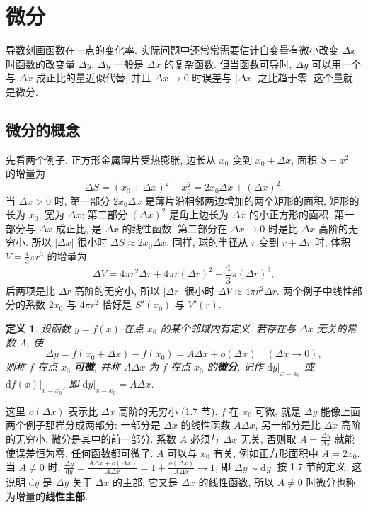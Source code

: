 \documentclass[UTF8,openany]{ctexbook}
\theoremstyle{chinesetextbook}
\newtheorem*{definitionsingle}{定义}
\newcommand{\dd}{\mathrm d}
\begin{document}
\section{微分}
导数刻画函数在一点的变化率. 实际问题中还常常需要估计自变量有微小改变 $\Delta x$ 时函数的改变量 $\Delta y$. $\Delta y$ 一般是 $\Delta x$ 的复杂函数. 但当函数可导时, $\Delta y$ 可以用一个与 $\Delta x$ 成正比的量近似代替, 并且 $\Delta x\to0$ 时误差与 $|\Delta x|$ 之比趋于零. 这个量就是微分.
\subsection{微分的概念}
先看两个例子. 正方形金属薄片受热膨胀, 边长从 $x_0$ 变到 $x_0+\Delta x$, 面积 $S=x^2$ 的增量为
\[
\Delta S=(x_0+\Delta x)^2-x_0^2=2x_0\Delta x+(\Delta x)^2.
\]
当 $\Delta x>0$ 时, 第一部分 $2x_0\Delta x$ 是薄片沿相邻两边增加的两个矩形的面积, 矩形的长为 $x_0$, 宽为 $\Delta x$; 第二部分 $(\Delta x)^2$ 是角上边长为 $\Delta x$ 的小正方形的面积. 第一部分与 $\Delta x$ 成正比, 是 $\Delta x$ 的线性函数; 第二部分在 $\Delta x\to0$ 时是比 $\Delta x$ 高阶的无穷小. 所以 $|\Delta x|$ 很小时 $\Delta S\approx2x_0\Delta x$. 同样, 球的半径从 $r$ 变到 $r+\Delta r$ 时, 体积 $\displaystyle V=\frac43\pi r^3$ 的增量为
\[
\Delta V=4\pi r^2\Delta r+4\pi r(\Delta r)^2+\frac43\pi(\Delta r)^3,
\]
后两项是比 $\Delta r$ 高阶的无穷小, 所以 $|\Delta r|$ 很小时 $\Delta V\approx4\pi r^2\Delta r$. 两个例子中线性部分的系数 $2x_0$ 与 $4\pi r^2$ 恰好是 $S'(x_0)$ 与 $V'(r)$.
\begin{definitionsingle}
设函数 $y=f(x)$ 在点 $x_0$ 的某个邻域内有定义. 若存在与 $\Delta x$ 无关的常数 $A$, 使
\[
\Delta y=f(x_0+\Delta x)-f(x_0)=A\Delta x+o(\Delta x)\quad(\Delta x\to0),
\]
则称 $f$ 在点 $x_0$ \textbf{可微}, 并称 $A\Delta x$ 为 $f$ 在点 $x_0$ 的\textbf{微分}, 记作 $\dd y\big|_{x=x_0}$ 或 $\dd f(x)\big|_{x=x_0}$, 即 $\dd y\big|_{x=x_0}=A\Delta x$.
\end{definitionsingle}
这里 $o(\Delta x)$ 表示比 $\Delta x$ 高阶的无穷小 (1.7 节). $f$ 在 $x_0$ 可微, 就是 $\Delta y$ 能像上面两个例子那样分成两部分: 一部分是 $\Delta x$ 的线性函数 $A\Delta x$, 另一部分是比 $\Delta x$ 高阶的无穷小. 微分是其中的前一部分. 系数 $A$ 必须与 $\Delta x$ 无关, 否则取 $\displaystyle A=\frac{\Delta y}{\Delta x}$ 就能使误差恒为零, 任何函数都可微了. $A$ 可以与 $x_0$ 有关, 例如正方形面积中 $A=2x_0$. 当 $A\ne0$ 时, $\displaystyle\frac{\Delta y}{\dd y}=\frac{A\Delta x+o(\Delta x)}{A\Delta x}=1+\frac{o(\Delta x)}{A\Delta x}\to1$, 即 $\Delta y\sim\dd y$. 按 1.7 节的定义, 这说明 $\dd y$ 是 $\Delta y$ 关于 $\Delta x$ 的主部; 它又是 $\Delta x$ 的线性函数, 所以 $A\ne0$ 时微分也称为增量的\textbf{线性主部}.
\end{document}
